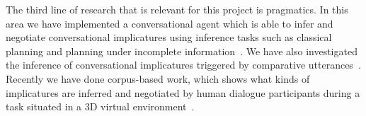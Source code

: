 
The third line of research that is relevant for this project is pragmatics. In
this area we have implemented a conversational agent which is able to infer and
negotiate conversational implicatures using inference tasks such as
classical planning and planning under incomplete information~\cite{benotti09b}.
We have also investigated the inference of conversational implicatures triggered
by comparative utterances~\cite{benotti09a}. Recently we have done corpus-based
work, which shows what kinds of implicatures are inferred and negotiated by
human dialogue participants during a task situated in a 3D
virtual environment~\cite{benotti09c}. 





